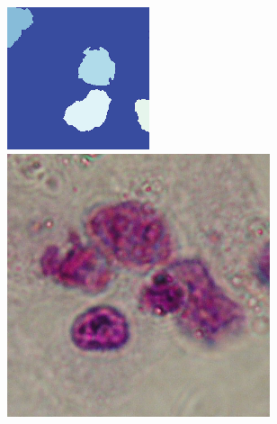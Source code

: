 \begin{figure}[t!]
	\includegraphics[width=0.97\linewidth]{Figures/Chapter2/6c3.png}
	\endminipage\hfill
	\centering	
	\includegraphics[width=0.97\linewidth]{Figures/Chapter2/6a4.png}	

\end{figure}
